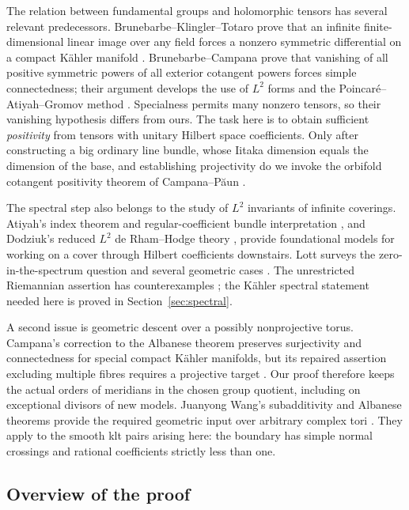 The relation between fundamental groups and holomorphic tensors has
several relevant predecessors. Brunebarbe--Klingler--Totaro prove that
an infinite finite-dimensional linear image over any field forces a
nonzero symmetric differential on a compact K\"ahler manifold
\cite[Theorem~0.1]{BrunebarbeKlinglerTotaro2013}.
Brunebarbe--Campana prove that vanishing of all positive symmetric
powers of all exterior cotangent powers forces simple connectedness;
their argument develops the use of \(L^2\) forms and the
Poincar\'e--Atiyah--Gromov method
\cite[Theorem~1.1]{BrunebarbeCampana2016}.
Specialness permits many nonzero tensors, so their vanishing
hypothesis differs from ours. The task here is to obtain sufficient
\emph{positivity} from tensors with unitary Hilbert space coefficients.
Only after constructing a big ordinary line bundle, whose Iitaka
dimension equals the dimension of the base, and establishing projectivity do we invoke the orbifold cotangent positivity theorem
of Campana--P\u aun \cite[Theorem~7.11]{CampanaPaun2019}.

The spectral step also belongs to the study of \(L^2\) invariants of
infinite coverings. Atiyah's index theorem and regular-coefficient
bundle interpretation \cite[Theorem~3.8 and Section~6.1]{Atiyah1976},
and Dodziuk's reduced \(L^2\) de Rham--Hodge theory
\cite{Dodziuk1977}, provide foundational models for working on a
cover through Hilbert coefficients downstairs. Lott surveys the
zero-in-the-spectrum question and several geometric cases
\cite{Lott1996}. The unrestricted Riemannian assertion has
counterexamples \cite{FarberWeinberger2001}; the K\"ahler spectral
statement needed here is proved in Section~\ref{sec:spectral}.

A second issue is geometric descent over a possibly nonprojective
torus. Campana's correction to the Albanese theorem preserves
surjectivity and connectedness for special compact K\"ahler
manifolds, but its repaired assertion excluding multiple fibres
requires a projective target \cite[Theorem~1.2]{CampanaCorrection}.
Our proof therefore keeps the actual orders of meridians in the
chosen group quotient, including on exceptional divisors of new
models. Juanyong Wang's subadditivity and Albanese theorems provide
the required geometric input over arbitrary complex tori
\cite[Theorems~A(II) and~C]{JWang2021}. They apply to the smooth klt
pairs arising here: the boundary has simple normal crossings and
rational coefficients strictly less than one.

\subsection{Overview of the proof}

